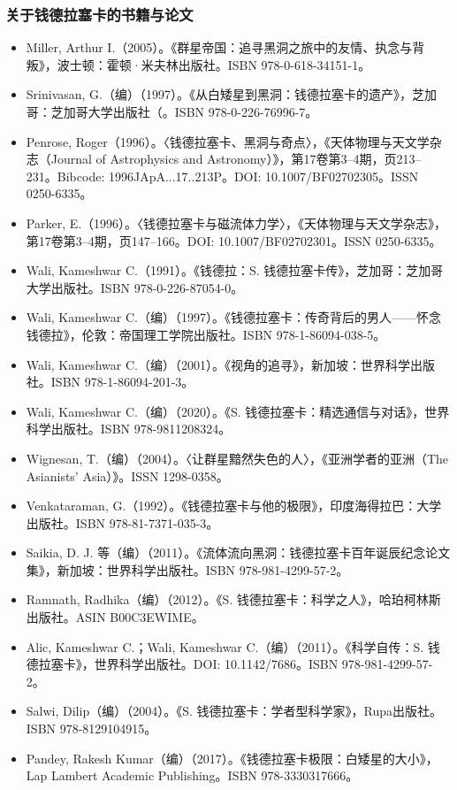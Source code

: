 \subsubsection{关于钱德拉塞卡的书籍与论文}
\begin{itemize}
\item Miller, Arthur I.（2005）。《群星帝国：追寻黑洞之旅中的友情、执念与背叛》，波士顿：霍顿·米夫林出版社。ISBN 978-0-618-34151-1。
\item Srinivasan, G.（编）（1997）。《从白矮星到黑洞：钱德拉塞卡的遗产》，芝加哥：芝加哥大学出版社（。ISBN 978-0-226-76996-7。
\item Penrose, Roger（1996）。〈钱德拉塞卡、黑洞与奇点〉，《天体物理与天文学杂志（Journal of Astrophysics and Astronomy）》，第17卷第3–4期，页213–231。Bibcode: 1996JApA...17..213P。DOI: 10.1007/BF02702305。ISSN 0250-6335。
\item Parker, E.（1996）。〈钱德拉塞卡与磁流体力学〉，《天体物理与天文学杂志》，第17卷第3–4期，页147–166。DOI: 10.1007/BF02702301。ISSN 0250-6335。
\item Wali, Kameshwar C.（1991）。《钱德拉：S. 钱德拉塞卡传》，芝加哥：芝加哥大学出版社。ISBN 978-0-226-87054-0。
\item Wali, Kameshwar C.（编）（1997）。《钱德拉塞卡：传奇背后的男人——怀念钱德拉》，伦敦：帝国理工学院出版社。ISBN 978-1-86094-038-5。
\item Wali, Kameshwar C.（编）（2001）。《视角的追寻》，新加坡：世界科学出版社。ISBN 978-1-86094-201-3。
\item Wali, Kameshwar C.（编）（2020）。《S. 钱德拉塞卡：精选通信与对话》，世界科学出版社。ISBN 978-9811208324。
\item Wignesan, T.（编）（2004）。〈让群星黯然失色的人〉，《亚洲学者的亚洲（The Asianists’ Asia）》。ISSN 1298-0358。
\item Venkataraman, G.（1992）。《钱德拉塞卡与他的极限》，印度海得拉巴：大学出版社。ISBN 978-81-7371-035-3。
\item Saikia, D. J. 等（编）（2011）。《流体流向黑洞：钱德拉塞卡百年诞辰纪念论文集》，新加坡：世界科学出版社。ISBN 978-981-4299-57-2。
\item Ramnath, Radhika（编）（2012）。《S. 钱德拉塞卡：科学之人》，哈珀柯林斯出版社。ASIN B00C3EWIME。
\item Alic, Kameshwar C.；Wali, Kameshwar C.（编）（2011）。《科学自传：S. 钱德拉塞卡》，世界科学出版社。DOI: 10.1142/7686。ISBN 978-981-4299-57-2。
\item Salwi, Dilip（编）（2004）。《S. 钱德拉塞卡：学者型科学家》，Rupa出版社。ISBN 978-8129104915。
\item Pandey, Rakesh Kumar（编）（2017）。《钱德拉塞卡极限：白矮星的大小》，Lap Lambert Academic Publishing。ISBN 978-3330317666。
\end{itemize}
